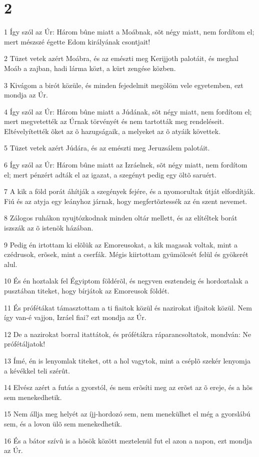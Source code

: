\chapter{2}

\par 1 Így szól az Úr: Három bûne miatt a Moábnak, sõt négy miatt, nem fordítom el; mert mészszé égette Edom királyának csontjait!
\par 2 Tüzet vetek azért Moábra, és az emészti meg Kerijjoth palotáit, és meghal Moáb a zajban, hadi lárma közt, a kürt zengése közben.
\par 3 Kivágom a birót közüle, és minden fejedelmit megölöm vele egyetemben, ezt mondja az Úr.
\par 4 Így szól az Úr: Három bûne miatt a Júdának, sõt négy miatt, nem fordítom el; mert megvetették az Úrnak törvényét és nem tartották meg rendeléseit. Eltévelyítették õket az õ hazugságaik, a melyeket az õ atyáik követtek.
\par 5 Tüzet vetek azért Júdára, és az emészti meg Jeruzsálem palotáit.
\par 6 Így szól az Úr: Három bûne miatt az Izráelnek, sõt négy miatt, nem fordítom el; mert pénzért adták el az igazat, a szegényt pedig egy öltõ saruért.
\par 7 A kik a föld porát áhítják a szegények fejére, és a nyomorultak útját elfordítják. Fiú és az atyja egy leányhoz járnak, hogy megfertõztessék az én szent nevemet.
\par 8 Zálogos ruhákon nyujtózkodnak minden oltár mellett, és az elítéltek borát iszszák az õ istenök házában.
\par 9 Pedig én irtottam ki elõlük az Emoreusokat, a kik magasak voltak, mint a czédrusok, erõsek, mint a cserfák. Mégis kiirtottam gyümölcsét felül és gyökerét alul.
\par 10 És én hoztalak fel Égyiptom földérõl, és negyven esztendeig és hordoztalak a pusztában titeket, hogy bírjátok az Emoreusok földét.
\par 11 És prófétákat támasztottam a ti fiaitok közül és nazirokat ifjaitok közül. Nem így van-é vajjon, Izráel fiai? ezt mondja az Úr.
\par 12 De a nazirokat borral itattátok, és prófétákra ráparancsoltatok, mondván: Ne prófétáljatok!
\par 13 Ímé, én is lenyomlak titeket, ott a hol vagytok, mint a cséplõ szekér lenyomja a kévékkel teli szérût.
\par 14 Elvész azért a futás a gyorstól, és nem erõsíti meg az erõst az õ ereje, és a hõs sem menekedhetik.
\par 15 Nem állja meg helyét az íjj-hordozó sem, nem menekülhet el még a gyorslábú sem, és a lovon ülõ sem menekedhetik.
\par 16 És a bátor szívû is a hõsök között meztelenül fut el azon a napon, ezt mondja az Úr.

